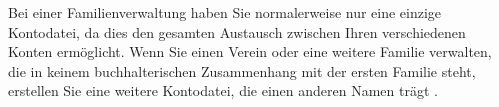 Bei einer Familienverwaltung haben Sie normalerweise nur eine einzige Kontodatei, da dies den gesamten Austausch zwischen Ihren verschiedenen Konten ermöglicht. Wenn Sie einen Verein oder eine weitere Familie verwalten, die in keinem buchhalterischen Zusammenhang mit der ersten Familie steht, erstellen Sie eine weitere Kontodatei, die einen anderen Namen trägt .%



